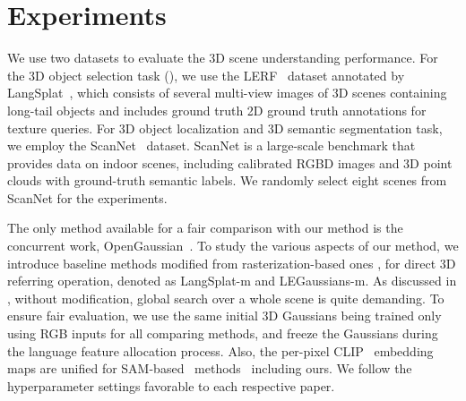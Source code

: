\section{Experiments} 
\label{sec:experiment}

We use two datasets to evaluate the 3D scene understanding performance. For the 3D object selection task (), we use the LERF~\cite{lerf} dataset annotated by LangSplat~\cite{langsplat}, which consists of several multi-view images of 3D scenes containing long-tail objects and includes ground truth 2D ground truth annotations for texture queries. For 3D object localization  and 3D semantic segmentation  task, we employ the ScanNet~\cite{dai2017scannet} dataset. ScanNet is a large-scale benchmark that provides data on indoor scenes, including calibrated RGBD images and 3D point clouds with ground-truth semantic labels. We randomly select eight scenes from ScanNet for the experiments.

The only method available for a fair comparison with our method is the concurrent work, OpenGaussian~\cite{open_gaussian}.
To study the various aspects of our method, we introduce baseline methods modified from rasterization-based ones \cite{langsplat,legaussian}, for direct 3D referring operation, denoted as LangSplat-m and LEGaussians-m.
As discussed in , without modification, global search over a whole scene is quite demanding. To ensure fair evaluation, we use the same initial 3D Gaussians being trained only using RGB inputs for all comparing methods, and freeze the Gaussians during the language feature allocation process. Also, the per-pixel CLIP~\cite{clip} embedding maps are unified for SAM-based~\cite{sam} methods~\cite{langsplat, open_gaussian} including ours. We follow the hyperparameter settings favorable to each respective paper.






